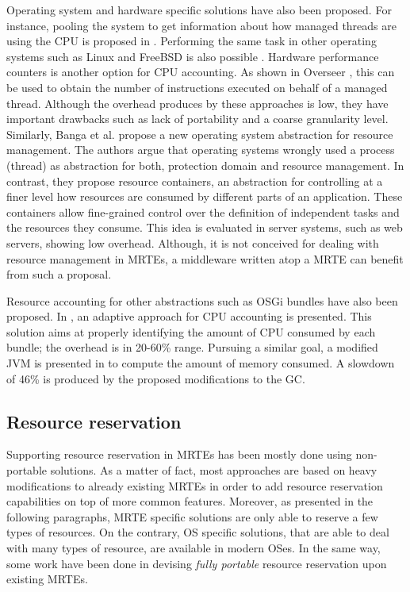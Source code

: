 Operating system and hardware specific solutions have also been proposed.
For instance, pooling the system to get information about how managed threads are using the CPU is proposed in \cite{czajkowski_jres:_1998}.
Performing the same task in other operating systems such as Linux and FreeBSD is also possible \cite{Soltesz:2007:COS:1272998.1273025, Kamp00jails:confining}.
Hardware performance counters is another option for CPU accounting.
As shown in Overseer \cite{DBLP:conf/pppj/PeternierBBP11}, this can be used to obtain the number of instructions executed on behalf of a managed thread.
Although the overhead produces by these approaches is low, they have important drawbacks such as lack of portability and a coarse granularity level.
Similarly, Banga et al. \cite{Banga:1999:RCN:296806.296810} propose a new operating system abstraction for resource management.
The authors argue that operating systems wrongly used a process (thread) as abstraction for both, protection domain and resource management.
In contrast, they propose resource containers, an abstraction for controlling at a finer level how resources are consumed by different parts of an application.
These containers allow fine-grained control over the definition of independent tasks and the resources they consume.
This idea is evaluated in server systems, such as web servers, showing low overhead.
Although, it is not conceived for dealing with resource management in MRTEs, a middleware written atop a MRTE can benefit from such a proposal.

Resource accounting for other abstractions such as OSGi bundles have also been proposed.
In \cite{Maurel:2012:AME:2304736.2304763}, an adaptive approach for CPU accounting is presented.
This solution aims at properly identifying the amount of CPU consumed by each bundle; the overhead is in 20-60\% range.
Pursuing a similar goal, a modified JVM is presented in \cite{Attouchi:2014:MMM:2602458.2602467} to compute the amount of memory consumed.
A slowdown of 46\% is produced by the proposed modifications to the GC.

\subsection{Resource reservation} \label{sec:resource-reservation-related}

Supporting resource reservation in MRTEs has been mostly done using non-portable solutions.
As a matter of fact, most approaches are based on heavy modifications to already existing MRTEs in order to add resource reservation capabilities on top of more common features.
Moreover, as presented in the following paragraphs, MRTE specific solutions are only able to reserve a few types of resources.
On the contrary, OS specific solutions, that are able to deal with many types of resource, are available in modern OSes.
In the same way, some work have been done in devising \textit{fully portable} resource reservation upon existing MRTEs.


